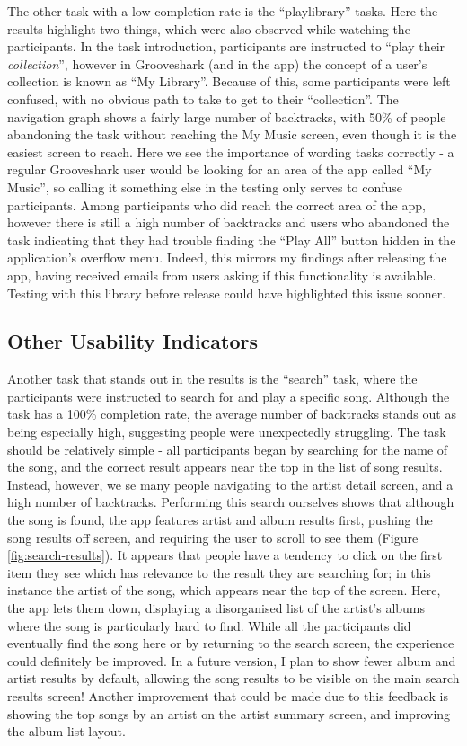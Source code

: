 The other task with a low completion rate is the ``playlibrary'' tasks. Here the results
highlight two things, which were also observed while watching the participants.
In the task introduction, participants are instructed to ``play their \emph{collection}'',
however in Grooveshark (and in the app) the concept of a user's collection is known as 
``My Library''. Because of this, some participants were left confused, with no obvious path
to take to get to their ``collection''. The navigation graph shows a fairly large number of
backtracks, with 50\% 
of people abandoning the task without reaching the My Music screen,
even though it is the easiest screen to reach. Here we see the importance of wording 
tasks correctly - a regular
Grooveshark user would be looking for an area of the app called ``My Music'', so
calling it something else in the testing only serves to confuse participants.
Among participants who did reach the correct area of the app, however there is still
a high number of backtracks and users who abandoned the task indicating that they had trouble
finding the ``Play All'' button hidden in the application's overflow menu. Indeed, this mirrors
my findings after releasing the app, having received emails from users asking if this functionality
is available. Testing with this library before release could have highlighted this issue sooner.

\subsection{Other Usability Indicators}

Another task that stands out in the results is the ``search'' task, where the participants
were instructed to search for and play a specific song. Although the task has a 100\% completion
rate, the average number of backtracks stands out as being especially high, suggesting people
were unexpectedly struggling. The task should be relatively simple - all participants
began by searching for the name of the song, and the correct result appears near the top
in the list of song results. Instead, however, we se many people navigating to the artist
detail screen, and a high number of backtracks. Performing this search ourselves shows that
although the song is found, the app features artist and album results first, pushing the
song results off screen, and requiring the user to scroll to see them (Figure
\ref{fig:search-results}). It appears that people
have a tendency to click on the first item they see which has relevance to the result they
are searching for; in this instance the artist of the song, which appears near the top
of the screen. Here, the app lets them down, displaying a disorganised list of the artist's
albums where the song is particularly hard to find. While all the participants did eventually
find the song here or by returning to the search screen, the experience could definitely be
improved. In a future version, I plan to show fewer album and artist results by default,
allowing the song results to be visible on the main search results screen! Another improvement
that could be made due to this feedback is showing the top songs by an artist on the artist
summary screen, and improving the album list layout.

